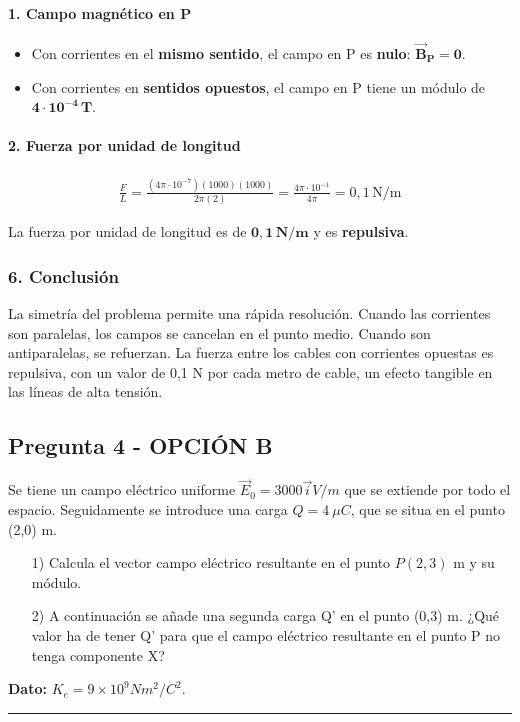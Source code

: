 \paragraph{1. Campo magnético en P}
\begin{cajaresultado}
\begin{itemize}
    \item Con corrientes en el \textbf{mismo sentido}, el campo en P es \textbf{nulo}: $\boldsymbol{\vec{B}_P = 0}$.
    \item Con corrientes en \textbf{sentidos opuestos}, el campo en P tiene un módulo de $\boldsymbol{4 \cdot 10^{-4}\,\textbf{T}}$.
\end{itemize}
\end{cajaresultado}
\paragraph{2. Fuerza por unidad de longitud}
\begin{gather}
    \frac{F}{L} = \frac{(4\pi\cdot 10^{-7})(1000)(1000)}{2\pi(2)} = \frac{4\pi\cdot 10^{-1}}{4\pi} = 0,1\,\text{N/m}
\end{gather}
\begin{cajaresultado}
La fuerza por unidad de longitud es de $\boldsymbol{0,1\,\textbf{N/m}}$ y es \textbf{repulsiva}.
\end{cajaresultado}

\subsubsection*{6. Conclusión}
\begin{cajaconclusion}
La simetría del problema permite una rápida resolución. Cuando las corrientes son paralelas, los campos se cancelan en el punto medio. Cuando son antiparalelas, se refuerzan. La fuerza entre los cables con corrientes opuestas es repulsiva, con un valor de 0,1 N por cada metro de cable, un efecto tangible en las líneas de alta tensión.
\end{cajaconclusion}

\newpage

\subsection{Pregunta 4 - OPCIÓN B}
\label{subsec:4B_2007_sep_ext}

\begin{cajaenunciado}
Se tiene un campo eléctrico uniforme $\vec{E}_{0}=3000\vec{i}V/m$ que se extiende por todo el espacio. Seguidamente se introduce una carga $Q=4~\mu C$, que se situa en el punto (2,0) m.
\begin{enumerate}
    \item[1)] Calcula el vector campo eléctrico resultante en el punto $P(2,3)$ m y su módulo.
    \item[2)] A continuación se añade una segunda carga Q' en el punto (0,3) m. ¿Qué valor ha de tener Q' para que el campo eléctrico resultante en el punto P no tenga componente X?
\end{enumerate}
\textbf{Dato:} $K_{e}=9\times10^{9}Nm^{2}/C^{2}$.
\end{cajaenunciado}
\hrule

